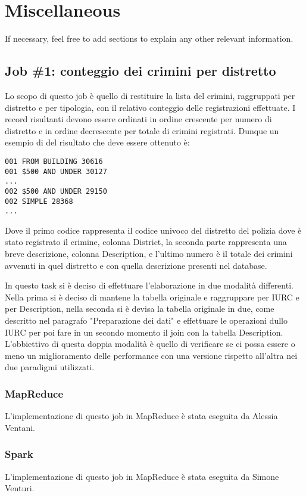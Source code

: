 \documentclass[10pt]{article}
\begin{document}
\section{Miscellaneous}

If necessary, feel free to add sections to explain any other relevant information.





\subsection{Job \#1: conteggio dei crimini per distretto}
Lo scopo di questo job è quello di restituire la lista del crimini, raggruppati per distretto e per tipologia, con il relativo conteggio delle registrazioni effettuate. I record risultanti devono essere ordinati in ordine crescente per numero di distretto e in ordine decrescente per totale di crimini registrati. Dunque un esempio di del risultato che deve essere ottenuto è:
\begin{lstlisting}
001	FROM BUILDING 30616
001	$500 AND UNDER 30127
...
002	$500 AND UNDER 29150
002	SIMPLE 28368
...
\end{lstlisting}
Dove il primo codice rappresenta il codice univoco del distretto del polizia dove è stato registrato il crimine, colonna District, la seconda parte rappresenta una breve descrizione, colonna Description, e l'ultimo numero è il totale dei crimini avvenuti in quel distretto e con quella descrizione presenti nel database.

In questo task si è deciso di effettuare l'elaborazione in due modalità differenti. Nella prima si è deciso di mantene la tabella originale e raggruppare per IURC e per Description, nella seconda si è devisa la tabella originale in due, come descritto nel paragrafo "Preparazione dei dati" e effettuare le operazioni dullo IURC per poi fare in un secondo momento il join con la tabella Description.\\
L'obbiettivo di questa doppia modalità è quello di verificare se ci possa essere o meno un miglioramento delle performance con una versione rispetto all'altra nei due paradigmi utilizzati.


\subsubsection{MapReduce}
L'implementazione di questo job in MapReduce è stata eseguita da Alessia Ventani.

\subsubsection{Spark}
L'implementazione di questo job in MapReduce è stata eseguita da Simone Venturi.
\end{document}
